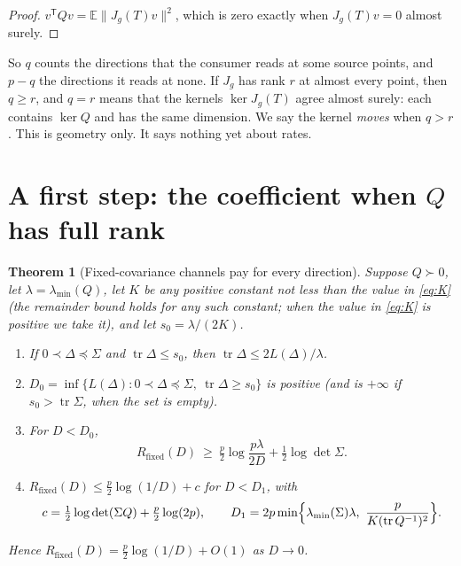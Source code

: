 \documentclass[11pt,onecolumn]{IEEEtran}
\newtheorem{theorem}{Theorem}
\newcommand{\E}{\mathbb{E}}
\newcommand{\tr}{\operatorname{tr}}
\newcommand{\lmin}{\lambda_{\min}}
\newcommand{\Rfix}{R_{\mathrm{fixed}}}
\begin{document}
\begin{proof}
$v^{\mathsf T}Qv=\E\|J_g(T)v\|^2$, which is zero exactly when $J_g(T)v=0$ almost surely.
\end{proof}

So $q$ counts the directions that the consumer reads at some source points, and
$p-q$ the directions it reads at none. If $J_g$ has rank $r$ at almost every point, then
$q\ge r$, and $q=r$ means that the kernels $\ker J_g(T)$ agree almost surely: each
contains $\ker Q$ and has the same dimension. We say the kernel \emph{moves} when
$q>r$. This is geometry only. It says nothing yet about rates.

\section{A first step: the coefficient when $Q$ has full rank}

\begin{theorem}[Fixed-covariance channels pay for every direction]\label{thm:A}
Suppose $Q\succ0$, let $\lambda=\lmin(Q)$, let $K$ be any positive constant not less than the value in \eqref{eq:K} (the remainder
bound holds for any such constant; when the value in \eqref{eq:K} is positive we take
it), and
let $s_0=\lambda/(2K)$.
\begin{enumerate}
\item[(a)] If $0\prec\Delta\preceq\Sigma$ and $\tr\Delta\le s_0$, then
$\tr\Delta\le 2L(\Delta)/\lambda$.
\item[(b)] $D_0=\inf\{L(\Delta):0\prec\Delta\preceq\Sigma,\ \tr\Delta\ge s_0\}$ is
positive (and is $+\infty$ if $s_0>\tr\Sigma$, when the set is empty).
\item[(c)] For $D<D_0$,
\[
\Rfix(D)\ \ge\ \tfrac p2\log\frac{p\lambda}{2D}+\tfrac12\log\det\Sigma .
\]
\item[(d)] $\Rfix(D)\le\tfrac p2\log(1/D)+c$ for $D<D_1$, with
\[
c=\tfrac12\log\det(\Sigma Q)+\tfrac p2\log(2p),\qquad
D_1=2p\min\Bigl\{\lmin(\Sigma)\lambda,\ \frac{p}{K(\tr Q^{-1})^2}\Bigr\}.
\]
\end{enumerate}
Hence $\Rfix(D)=\tfrac p2\log(1/D)+O(1)$ as $D\to0$.
\end{theorem}
\end{document}
